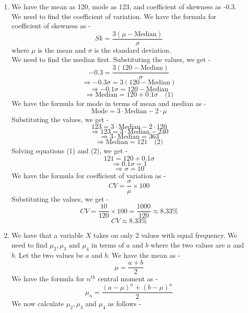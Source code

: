 \begin{enumerate}
    \[\sigma = \sqrt{42.25} = 6.5\]
    Substituting the values, we get -
    \[0.32 = \frac{3(29.6 - \text{Median})}{6.5}\]
    \[\Rightarrow 0.32 \cdot 6.5 = 3(29.6 - \text{Median})\]
    \[\Rightarrow 2.08 = 88.8 - 3 \cdot \text{Median}\]
    \[\Rightarrow 3 \cdot \text{Median} = 88.8 - 2.08 = 86.72\]
    \[\Rightarrow \text{Median} = \frac{86.72}{3} \approx 28.91\]
    \[\boxed{\text{Median} \approx 28.91
    }\]
    We have the formula for mode in terms of mean and median as -
    \[\text{Mode} = 3 \cdot \text{Median} - 2 \cdot \mu\]
    \[= 3 \cdot 28.91 - 2 \cdot 29.6\]
    \[= 86.73 - 59.2 = 27.53\]
    \[\boxed{\text{Mode} \approx 27.53
    }\]
    \item We have the mean as 120, mode as 123, and coefficient of skewness as -0.3. We need to find the coefficient of variation. 
    We have the formula for coefficient of skewness as -
    \[Sk = \frac{3(\mu - \text{Median})}{\sigma}\]
    where $\mu$ is the mean and $\sigma$ is the standard deviation. \\
    We need to find the median first. Substituting the values, we get -
    \[-0.3 = \frac{3(120 - \text{Median})}{\sigma}\]
    \[\Rightarrow -0.3 \sigma = 3(120 - \text{Median})\]
    \[\Rightarrow -0.1 \sigma = 120 - \text{Median}\]
    \[\Rightarrow \text{Median} = 120 + 0.1 \sigma \quad \text{(1)}\]
    We have the formula for mode in terms of mean and median as -
    \[\text{Mode} = 3 \cdot \text{Median} - 2 \cdot \mu\]
    Substituting the values, we get -
    \[123 = 3 \cdot \text{Median} - 2 \cdot 120\]
    \[\Rightarrow 123 = 3 \cdot \text{Median} - 240\]
    \[\Rightarrow 3 \cdot \text{Median} = 363\]
    \[\Rightarrow \text{Median} = 121 \quad \text{(2)}\]
    Solving equations (1) and (2), we get -
    \[121 = 120 + 0.1 \sigma\]
    \[\Rightarrow 0.1 \sigma = 1\]
    \[\Rightarrow \sigma = 10\]
    We have the formula for coefficient of variation as -
    \[CV = \frac{\sigma}{\mu} \times 100\]
    Substituting the values, we get -
    \[CV = \frac{10}{120} \times 100 = \frac{1000}{120} \approx 8.33\%\]
    \[\boxed{CV \approx 8.33\%}\]
    \item We have that a variable $X$ takes on only 2 values with equal frequency. We need to find $\mu_2, \mu_3$ and $\mu_4$ in terms of $a$ and $b$ where the two values are $a$ and $b$.
    Let the two values be $a$ and $b$. We have the mean as -
    \[\mu = \frac{a + b}{2}\]
    We have the formula for $n^{th}$ central moment as -
    \[\mu_n = \frac{(a - \mu)^n + (b - \mu)^n}{2}\]
    We now calculate $\mu_2, \mu_3$ and $\mu_4$ as follows -

\end{enumerate}
